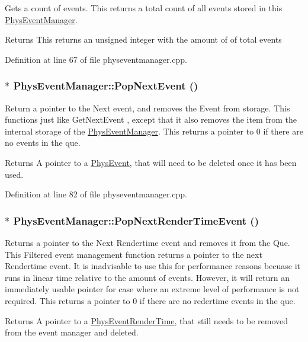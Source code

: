 Gets a count of events. This returns a total count of all events stored in this \hyperlink{classPhysEventManager}{PhysEventManager}. \begin{DoxyReturn}{Returns}
This returns an unsigned integer with the amount of of total events 
\end{DoxyReturn}


Definition at line 67 of file physeventmanager.cpp.\hypertarget{classPhysEventManager_a3122b32172326ac32cfecc828b820977}{
\subsubsection[{PopNextEvent}]{ $\ast$ PhysEventManager::PopNextEvent ()}}
\label{d5/dd7/classPhysEventManager_a3122b32172326ac32cfecc828b820977}


Return a pointer to the Next event, and removes the Event from storage. This functions just like GetNextEvent , except that it also removes the item from the internal storage of the \hyperlink{classPhysEventManager}{PhysEventManager}. This returns a pointer to 0 if there are no events in the que. \begin{DoxyReturn}{Returns}
A pointer to a \hyperlink{classPhysEvent}{PhysEvent}, that will need to be deleted once it has been used. 
\end{DoxyReturn}


Definition at line 82 of file physeventmanager.cpp.\hypertarget{classPhysEventManager_ad627925363fdbcff98e0faef204e81e2}{
\subsubsection[{PopNextRenderTimeEvent}]{ $\ast$ PhysEventManager::PopNextRenderTimeEvent ()}}
\label{d5/dd7/classPhysEventManager_ad627925363fdbcff98e0faef204e81e2}


Returns a pointer to the Next Rendertime event and removes it from the Que. This Filtered event management function returns a pointer to the next Rendertime event. It is inadvisable to use this for performance reasons becuase it runs in linear time relative to the amount of events. However, it will return an immediately usable pointer for case where an extreme level of performance is not required. This returns a pointer to 0 if there are no redertime events in the que. \begin{DoxyReturn}{Returns}
A pointer to a \hyperlink{classPhysEventRenderTime}{PhysEventRenderTime}, that still needs to be removed from the event manager and deleted. 
\end{DoxyReturn}


